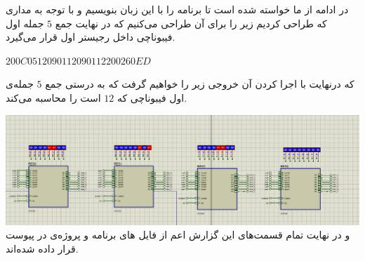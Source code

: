 \pagebreak

در ادامه از ما خواسته شده است 
تا برنامه
را با این زبان بنویسیم و
با توجه به مداری که طراحی کردیم 
زیر را برای آن طراحی می‌کنیم که
در نهایت جمع
$5$
جمله اول فیبوناچی داخل رجیستر اول قرار می‌گیرد.

\raggedright

$200C0512090112090112200260ED$

\raggedleft

که درنهایت با اجرا کردن آن خروجی زیر را خواهیم گرفت که به درستی
جمع
$5$
جمله‌ی اول فیبوناچی که
$12$
است را محاسبه می‌کند.


\includegraphics[width=18cm]{figures/fib.png}
و در نهایت
تمام قسمت‌های این گزارش
اعم از فایل
های برنامه
و 
پروژه‌ی
در پیوست قرار داده شده‌اند.





